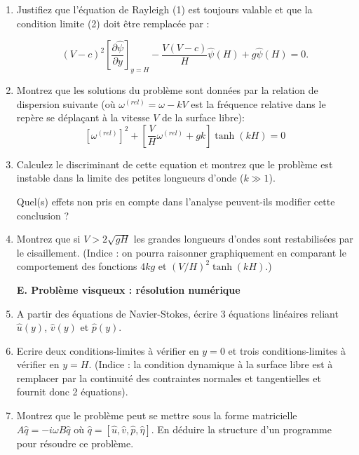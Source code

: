 \documentclass[a4paper,11pt]{article}
\begin{document}
\begin{enumerate}


{\bf D. Solution dans le cas d'un cisaillement linéaire et d'une stratification inversée}

On suppose que le profil de vitesse est linéaire :
$\bar{U}(y) = V y/H$ 
Et que la gravité est maintenant orientée dans la direction $+y$ :

$\vec g = + g \vec e_y$ avec $g >0$. 

(En retournant les axes il s'agit donc d'un film liquide cisaillé "suspendu" sous une paroi horizontale).


\item Justifiez que l'équation de Rayleigh (1) est toujours valable et que la condition limite (2) doit être remplacée par :

 $$\left( V - c\right)^2  {\left[ \frac{\partial \hat{\psi}}{\partial y} \right] }_{y=H}  - \frac{V\left( V - c\right)}{H} \hat{\psi}(H) + g \hat{\psi}(H) = 0.
 $$

\item Montrez que les solutions du problème sont données par la relation de dispersion suivante  (où $\omega^{(rel)} = \omega - k V$ est la fréquence relative dans le repère se déplaçant à la vitesse $V$ de la surface libre): 
$$
\left[\omega^{(rel)}\right]^2 + \left[ \frac{V}{H} \omega^{(rel)} + g k \right] \tanh ( kH ) =0
$$

\item  Calculez le discriminant de cette equation et montrez que le problème est instable dans la limite des petites longueurs d'onde ($k\gg 1$).

Quel(s) effets non pris en compte dans l'analyse peuvent-ils modifier cette conclusion ?


\item 
Montrez que si $V>2 \sqrt{gH}$ les grandes longueurs d'ondes sont restabilisées par le cisaillement.
(Indice : on pourra raisonner graphiquement en comparant le comportement des fonctions $4kg$ et $(V/H)^2 \tanh(kH)$.)


{\bf E. Problème visqueux : résolution numérique}

\item A partir des équations de Navier-Stokes, écrire 3 équations linéaires 
reliant $ \hat{u}(y)$, $\hat{v}(y)$ et $\hat{p}(y)$.

\item Ecrire deux conditions-limites à vérifier en $y=0$ et trois conditions-limites à vérifier en $y=H$.
(Indice : la condition dynamique à la surface libre est à remplacer par la continuité des contraintes normales et tangentielles et fournit donc 2 équations). 
  
\item Montrez que le problème peut se mettre sous la forme matricielle $A \hat{q} = - i \omega B \hat{q}$ où $\hat{q} = [ \hat{u}, \hat{v}, \hat{p} , \hat{\eta} ]$. En déduire la structure d'un programme pour résoudre ce problème. 
  
\end{enumerate}
\end{document}
